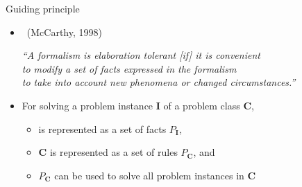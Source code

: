 \begin{frame}{Guiding principle}
  \bigskip
  \begin{itemize}
  \item<1->  \ (McCarthy, 1998)
    \medskip

    {\itshape
    ``A formalism is \alert<1>{elaboration tolerant} \textnormal{[if]} it is convenient
    \\\hspace{2pt} to modify a set of facts expressed in the formalism
    \\\hspace{2pt} to take into account new phenomena or changed circumstances.''
    }

    \bigskip
  \item<2-> 
    \medskip

    For solving a problem instance \textbf{I} of a problem class \textbf{C},
    \begin{itemize}
    \item {} is represented as a set of facts $P_{\textbf{I}}$,
    \item \textbf{C} is represented as a set of rules $P_{\textbf{C}}$, and
      \medskip
    \item $P_{\textbf{C}}$ can be used to solve all problem instances in \textbf{C}
    \end{itemize}
  \end{itemize}
\end{frame}

